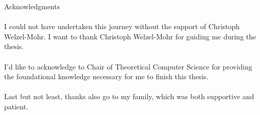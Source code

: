 \thispagestyle{empty}

\vspace*{20mm}

\begin{center}
    { Acknowledgments}
\end{center}

\vspace{10mm}
\paragraph{}
I could not have undertaken this journey without the support of Christoph Welzel-Mohr.
I want to thank Christoph Welzel-Mohr for guiding me during the thesis.
\paragraph{}
I’d like to acknowledge to Chair of Theoretical Computer Science
for providing the foundational knowledge necessary for me to finish this thesis.
\paragraph{}
Last but not least, thanks also go to my family, which was both supportive and patient.

{\raggedleft\vfill\itshape{}\par
}

\cleardoublepage{}